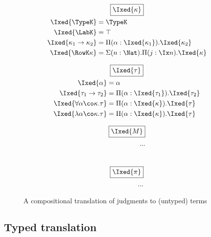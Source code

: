 \documentclass[authoryear,acmsmall,screen]{acmart}
\begin{document}
\begin{figure}[H]
\begin{gather*}
\fbox{$\Ixed{\kappa}$} \\
\begin{align*}
\vspace{5em}
\Ixed{\TypeK} &= \TypeK \\
\Ixed{\LabK} &= \top \\
\Ixed{\kappa_1 \to \kappa_2} &= \Pi (\alpha : \Ixed{\kappa_1}). \Ixed{\kappa_2} \\
\Ixed{\RowK \kappa} &= \Sigma(n : \Nat). \Pi (j : \Ix  n). \Ixed{\kappa} \\
\end{align*}
\end{gather*}

\begin{gather*}
\fbox{$\Ixed{\tau}$} \\
\begin{align*}
\vspace{5em}
\Ixed{\alpha} &= \alpha \\
\Ixed{\tau_1 \to \tau_2} &= \Pi (\alpha : \Ixed{\tau_1}).\Ixed{\tau_2} \\
\Ixed{\forall \alpha \co \kappa. \tau} &= \Pi (\alpha : \Ixed{\kappa}).\Ixed{\tau} \\
\Ixed{\lambda \alpha \co \kappa. \tau} &= \Pi (\alpha : \Ixed{\kappa}).\Ixed{\tau} \\
\end{align*}
\end{gather*}

\begin{align*}
\fbox{$\Ixed{M}$} \\
\vspace{5em}
...
\end{align*} \\
\begin{align*}
\fbox{$\Ixed{\pi}$} \\
\vspace{5em}
...
\end{align*}
\caption{A compositional translation of \RO judgments to (untyped) \IX{} terms}
\label{fig:translation}
\end{figure}


\subsection{Typed translation}
\end{document}
